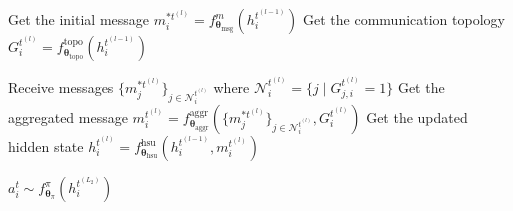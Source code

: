 \begin{algorithm}[!t]
\begin{algorithmic}[1]
            \STATE Get the initial message $m_i^{*t^{(l)}} = f_{\boldsymbol{\theta}_\text{msg}}^m(h_i^{t^{(l-1)}})$ 
            \STATE Get the communication topology $G_i^{t^{(l)}} = f_{\boldsymbol{\theta}_\text{topo}}^\text{topo}(h_i^{t^{(l-1)}})$ 
        \ENDFOR
        
            \STATE Receive messages $\{m_j^{*t^{(l)}}\}_{j \in \mathcal{N}_i^{t^{(l)}}}$ where $\mathcal{N}_i^{t^{(l)}} = \{j \mid G_{j,i}^{t^{(l)}} = 1\}$
            \STATE Get the aggregated message $m_i^{t^{(l)}} = f_{\boldsymbol{\theta}_\text{aggr}}^\text{aggr}(\{m_j^{*t^{(l)}}\}_{j \in \mathcal{N}_i^{t^{(l)}}}, G_i^{t^{(l)}})$ 
            \STATE Get the updated hidden state $h_i^{t^{(l)}} = f_{\boldsymbol{\theta}_\text{hsu}}^\text{hsu}(h_i^{t^{(l-1)}}, m_i^{t^{(l)}})$ 
        \ENDFOR
    \ENDFOR
    
        \STATE $a_i^t \sim f_{\boldsymbol{\theta}_\pi}^{\pi}(h_i^{t^{(L_2)}})$ 
    \ENDFOR
\ENDFOR

\end{algorithmic}
\end{algorithm}

